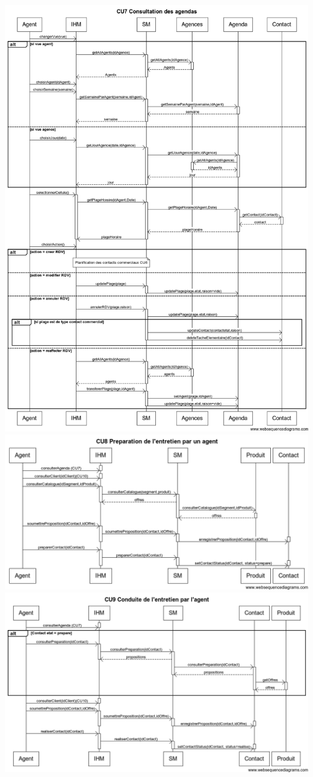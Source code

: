 \begin {center}
\includegraphics[width=\textwidth]{../../webSequenceDiagrameSources/cu7.png}
\includegraphics[width=\textwidth]{../../webSequenceDiagrameSources/cu8.png}
\includegraphics[width=\textwidth]{../../webSequenceDiagrameSources/cu9.png}

\end{center}
